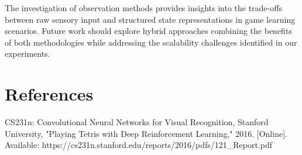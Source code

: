 \documentclass[conference]{IEEEtran}
\begin{document}
The investigation of observation methods provides insights into the trade-offs between raw sensory input and structured state representations in game learning scenarios. Future work should explore hybrid approaches combining the benefits of both methodologies while addressing the scalability challenges identified in our experiments.

\section{References}

\begin{thebibliography}{1}
CS231n: Convolutional Neural Networks for Visual Recognition, Stanford University, "Playing Tetris with Deep Reinforcement Learning," 2016. [Online]. Available: https://cs231n.stanford.edu/reports/2016/pdfs/121\_Report.pdf
\end{thebibliography}
\end{document}

